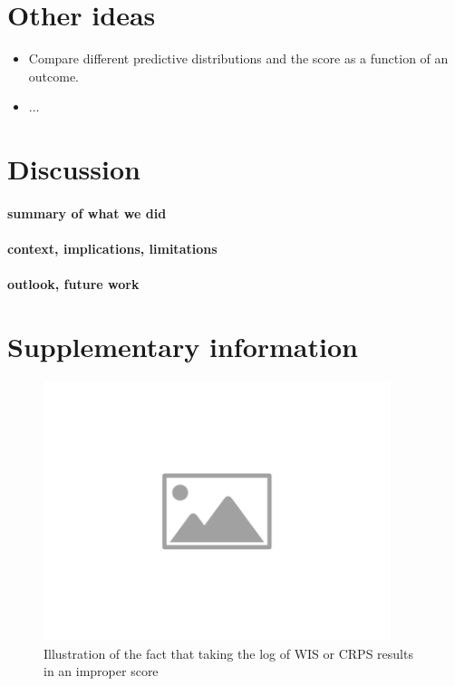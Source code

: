 \documentclass{article}
\begin{document}
\section{Other ideas}
\begin{itemize}
    \item Compare different predictive distributions and the score as a function of an outcome.
    \item ...
\end{itemize}




\section{Discussion}

\paragraph{summary of what we did}

\paragraph{context, implications, limitations}

\paragraph{outlook, future work}


 




\newpage

\appendix
\section{Supplementary information}

\begin{figure}[h!]
    \centering
    \includegraphics[width=0.9\textwidth]{output/placeholder-image.png}
    \caption{Illustration of the fact that taking the log of WIS or CRPS results in an improper score}
    \label{fig:log-improper}
\end{figure}
\end{document}
